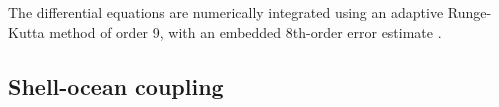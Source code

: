 \documentclass[lineno, pdflatex,sn-mathphys-ay]{sn-jnl}
\theoremstyle{thmstyleone}%
\theoremstyle{thmstyletwo}%
\theoremstyle{thmstylethree}%
\begin{document}


%

The differential equations are numerically integrated using an adaptive Runge-Kutta method of order 9, with an embedded 8th-order error estimate \citep{Verner2010}. %




\subsection{Shell-ocean coupling}\label{sec:ocean_rayleigh_V2}

\end{document}
